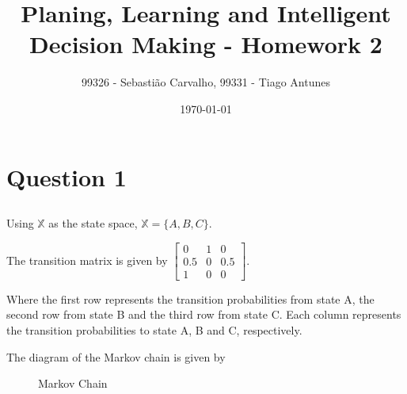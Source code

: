 \documentclass{article}
\title{Planing, Learning and Intelligent Decision Making - Homework 2}
\author{99326 - Sebastião Carvalho, 99331 - Tiago Antunes}
\date{\today}
\begin{document}
\maketitle

\tableofcontents

\section{Question 1}

\subsection{}

Using $\mathbb{X}$ as the state space, $\mathbb{X} = \{ A, B, C\}$.

\bigskip

The transition matrix is given by
$
\begin{bmatrix}
    0 & 1 & 0 \\
    0.5 & 0 & 0.5 \\
    1 & 0 & 0
\end{bmatrix}
$.

\bigskip

Where the first row represents the transition probabilities from state A, the second row from state B and the third row from state C.
Each column represents the transition probabilities to state A, B and C, respectively.

\bigskip

The diagram of the Markov chain is given by

\begin{figure}
    \centering
    \caption{Markov Chain}
    \label{fig: markov_chain}
\end{figure}


\subsection{}
\end{document}
